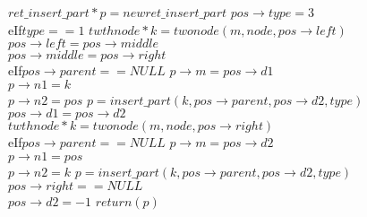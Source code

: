 \documentclass[20pt]{article}
\begin{document}
\begin{algorithm}
    $ret\_insert\_part* p=new ret\_insert\_part$
     {
        $pos \rightarrow type=3$ \\
        eIf{$type==1$}{
            $twthnode* k=twonode(m,node,pos \rightarrow left)$ \\
            $pos \rightarrow left=pos \rightarrow middle$ \\
            $pos \rightarrow middle=pos \rightarrow right$ \\
            eIf{$pos \rightarrow parent==NULL$}{
                $p \rightarrow m=pos \rightarrow d1$ \\
                $p \rightarrow n1=k$ \\
                $p \rightarrow n2=pos$
            } {
                $p=insert\_part(k,pos \rightarrow parent, pos \rightarrow d2,type)$
            }
            $pos \rightarrow d1=pos \rightarrow d2$ \\
        } {
            $twthnode* k=twonode(m,node,pos \rightarrow right)$ \\
            eIf{$pos \rightarrow parent==NULL$}{
                $p \rightarrow m=pos \rightarrow d2$ \\
                $p \rightarrow n1=pos$ \\
                $p \rightarrow n2=k$
            } {
                $p=insert\_part(k,pos \rightarrow parent, pos \rightarrow d2,type)$
            }
        }
            $pos \rightarrow right==NULL$ \\
            $pos \rightarrow d2= -1$
    }
    $return (p)$



\end{algorithm}
\end{document}
